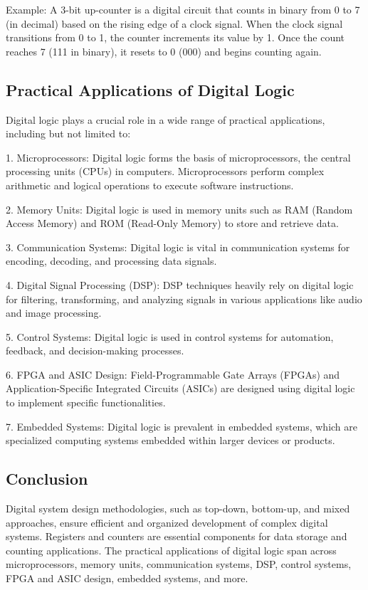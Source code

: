 \documentclass{article}
\begin{document}
Example: A 3-bit up-counter is a digital circuit that counts in binary from 0 to 7 (in decimal) based on the rising edge of a clock signal. When the clock signal transitions from 0 to 1, the counter increments its value by 1. Once the count reaches 7 (111 in binary), it resets to 0 (000) and begins counting again.

\subsection{Practical Applications of Digital Logic}

Digital logic plays a crucial role in a wide range of practical applications, including but not limited to:

1. Microprocessors: Digital logic forms the basis of microprocessors, the central processing units (CPUs) in computers. Microprocessors perform complex arithmetic and logical operations to execute software instructions.

2. Memory Units: Digital logic is used in memory units such as RAM (Random Access Memory) and ROM (Read-Only Memory) to store and retrieve data.

3. Communication Systems: Digital logic is vital in communication systems for encoding, decoding, and processing data signals.

4. Digital Signal Processing (DSP): DSP techniques heavily rely on digital logic for filtering, transforming, and analyzing signals in various applications like audio and image processing.

5. Control Systems: Digital logic is used in control systems for automation, feedback, and decision-making processes.

6. FPGA and ASIC Design: Field-Programmable Gate Arrays (FPGAs) and Application-Specific Integrated Circuits (ASICs) are designed using digital logic to implement specific functionalities.

7. Embedded Systems: Digital logic is prevalent in embedded systems, which are specialized computing systems embedded within larger devices or products.

\subsection{Conclusion}

Digital system design methodologies, such as top-down, bottom-up, and mixed approaches, ensure efficient and organized development of complex digital systems. Registers and counters are essential components for data storage and counting applications. The practical applications of digital logic span across microprocessors, memory units, communication systems, DSP, control systems, FPGA and ASIC design, embedded systems, and more.
\end{document}
